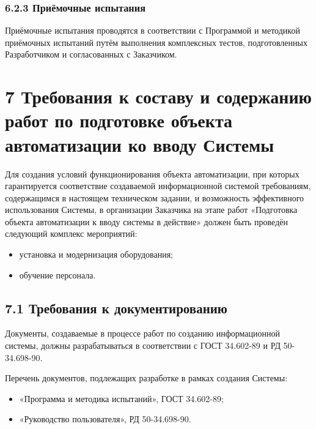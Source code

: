 \subsubsection*{6.2.3 Приёмочные испытания}
Приёмочные испытания проводятся в соответствии с Программой и методикой
приёмочных испытаний путём выполнения комплексных тестов, подготовленных
Разработчиком и согласованных с Заказчиком. 

\section*{7 Требования к составу и содержанию работ по подготовке объекта автоматизации ко вводу Системы}
Для создания условий функционирования объекта автоматизации, при которых
гарантируется соответствие создаваемой информационной системой требованиям,
содержащимся в настоящем техническом задании, и возможность эффективного
использования Системы, в организации Заказчика на этапе работ
«Подготовка объекта автоматизации к вводу системы в действие» должен
быть проведён следующий комплекс мероприятий:
\begin{itemize}
  \item установка и модернизация оборудования;
  \item обучение персонала.
\end{itemize}

\subsection*{7.1 Требования к документированию}
Документы, создаваемые в процессе работ по созданию
информационной системы, должны разрабатываться в
соответствии с ГОСТ 34.602-89 и РД 50-34.698-90.

Перечень документов, подлежащих разработке в рамках
создания Системы:
\begin{itemize}
  \item «Программа и методика испытаний», ГОСТ 34.602-89;
  \item «Руководство пользователя», РД 50-34.698-90.
\end{itemize}

\newpage
